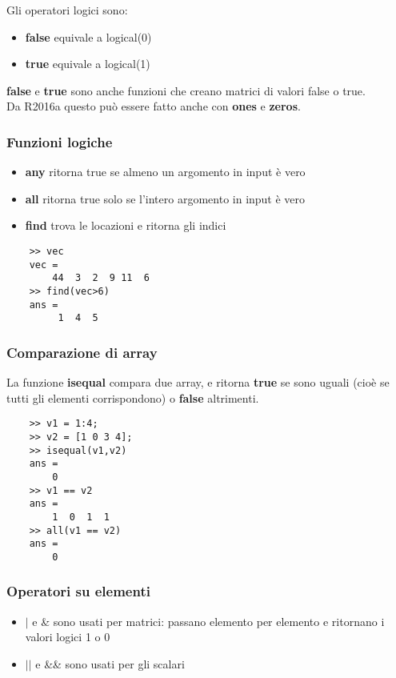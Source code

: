 \documentclass[a4paper, 10pt]{article}
\begin{document}
Gli operatori logici sono:

\begin{itemize}
\item \textbf{false} equivale a logical(0)
\item \textbf{true} equivale a logical(1)
\end{itemize}
\textbf{false} e \textbf{true} sono anche funzioni che creano matrici di valori false o true.\\
Da R2016a questo può essere fatto anche con \textbf{ones} e \textbf{zeros}.

\subsubsection{Funzioni logiche}
\begin{itemize}
\item \textbf{any} ritorna true se almeno un argomento in input è vero
\item \textbf{all} ritorna true solo se l'intero argomento in input è vero
\item \textbf{find} trova le locazioni e ritorna gli indici 
\end{itemize}

\begin{lstlisting}
	>> vec
	vec =
		44  3  2  9 11  6
	>> find(vec>6)
	ans =
		 1  4  5
\end{lstlisting}

\subsubsection{Comparazione di array}
La funzione \textbf{isequal} compara due array, e ritorna \textbf{true} se sono uguali (cioè se tutti gli elementi corrispondono) o \textbf{false} altrimenti.

\begin{lstlisting}
	>> v1 = 1:4;
	>> v2 = [1 0 3 4];
	>> isequal(v1,v2)
	ans =
		0
	>> v1 == v2
	ans =
		1  0  1  1
	>> all(v1 == v2)
	ans =
		0
\end{lstlisting}

\subsubsection{Operatori su elementi}
\begin{itemize}
\item $\vert$ e \& sono usati per matrici: passano elemento per elemento e ritornano i valori logici 1 o 0
\item $\vert\vert$ e \&\& sono usati per gli scalari
\end{itemize}
\end{document}
